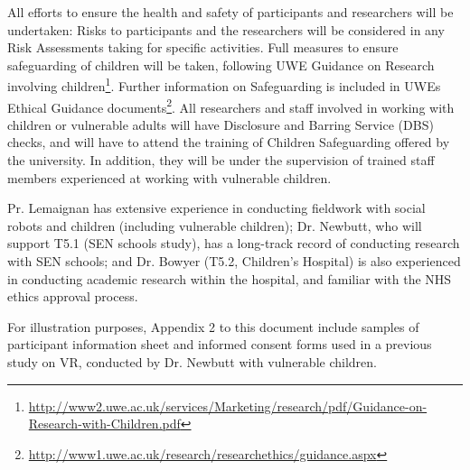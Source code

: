 \documentclass[11pt,a4paper]{report}
\begin{document}
All efforts to ensure the health and safety of participants and researchers will
be undertaken: Risks to participants and the researchers will be considered in
any Risk Assessments taking for specific activities.  Full measures to ensure
safeguarding of children will be taken, following UWE Guidance on Research
involving
children\footnote{\url{http://www2.uwe.ac.uk/services/Marketing/research/pdf/Guidance-on-Research-with-Children.pdf}}.
Further information on Safeguarding is included in UWEs Ethical Guidance
documents\footnote{\url{http://www1.uwe.ac.uk/research/researchethics/guidance.aspx}}.
All researchers and staff involved in working with children or vulnerable adults
will have Disclosure and Barring Service (DBS) checks, and will have to attend the
training of Children Safeguarding offered by the university. In addition, they
will be under the supervision of trained staff members experienced at working
with vulnerable children.

Pr. Lemaignan has extensive experience in
conducting fieldwork with social robots and children (including vulnerable
children); Dr. Newbutt, who will support T5.1 (SEN schools study), has a
long-track record of conducting research with SEN schools; and Dr. Bowyer (T5.2,
Children's Hospital) is also experienced in conducting academic research within
the hospital, and familiar with the NHS ethics approval process.


For illustration purposes, Appendix 2 to this document include samples of
participant information sheet and informed consent forms used in a previous
study on VR, conducted by Dr. Newbutt with vulnerable children.
\end{document}
